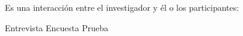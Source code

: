 
\question Es una interacción entre el investigador y él o los participantes:

  \begin{oneparchoices}
    \CorrectChoice Entrevista
    \choice Encuesta
    \choice Prueba
  \end{oneparchoices}
